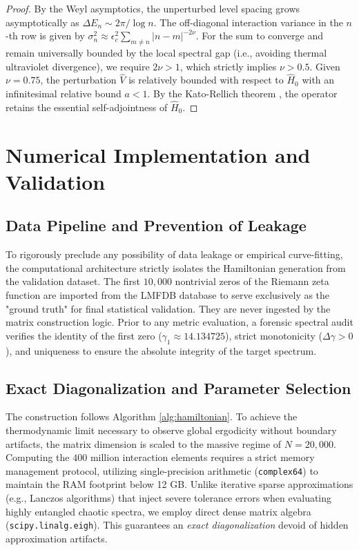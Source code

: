 \documentclass[aps,prl,preprint,superscriptaddress,floatfix]{revtex4-2}
\begin{document}
\begin{proof}
By the Weyl asymptotics, the unperturbed level spacing grows asymptotically as $\Delta E_n \sim 2\pi / \log n$. The off-diagonal interaction variance in the $n$-th row is given by $\sigma_n^2 \approx \epsilon_c^2 \sum_{m \neq n} |n-m|^{-2\nu}$. For the sum to converge and remain universally bounded by the local spectral gap (i.e., avoiding thermal ultraviolet divergence), we require $2\nu > 1$, which strictly implies $\nu > 0.5$. Given $\nu = 0.75$, the perturbation $\hat{V}$ is relatively bounded with respect to $\hat{H}_0$ with an infinitesimal relative bound $a < 1$. By the Kato-Rellich theorem \cite{ReedSimon1975}, the operator retains the essential self-adjointness of $\hat{H}_0$.
\end{proof}

\section{Numerical Implementation and Validation}

\subsection{Data Pipeline and Prevention of Leakage}
To rigorously preclude any possibility of data leakage or empirical curve-fitting, the computational architecture strictly isolates the Hamiltonian generation from the validation dataset. The first $10,000$ nontrivial zeros of the Riemann zeta function are imported from the LMFDB database \cite{LMFDB} to serve exclusively as the "ground truth" for final statistical validation. They are never ingested by the matrix construction logic. Prior to any metric evaluation, a forensic spectral audit verifies the identity of the first zero ($\gamma_1 \approx 14.134725$), strict monotonicity ($\Delta \gamma > 0$), and uniqueness to ensure the absolute integrity of the target spectrum.

\subsection{Exact Diagonalization and Parameter Selection}
The construction follows Algorithm \ref{alg:hamiltonian}. To achieve the thermodynamic limit necessary to observe global ergodicity without boundary artifacts, the matrix dimension is scaled to the massive regime of $N=20,000$. Computing the $400$ million interaction elements requires a strict memory management protocol, utilizing single-precision arithmetic (\texttt{complex64}) to maintain the RAM footprint below 12 GB.
Unlike iterative sparse approximations (e.g., Lanczos algorithms) that inject severe tolerance errors when evaluating highly entangled chaotic spectra, we employ direct dense matrix algebra (\texttt{scipy.linalg.eigh}). This guarantees an \textit{exact diagonalization} devoid of hidden approximation artifacts.
\end{document}
